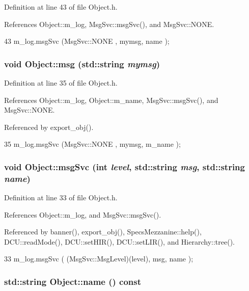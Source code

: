 Definition at line 43 of file Object.h.

References Object::m\_\-log, MsgSvc::msgSvc(), and MsgSvc::NONE.


\begin{DoxyCode}
43 { m_log.msgSvc (MsgSvc::NONE    , mymsg, name ); }
\end{DoxyCode}
\hypertarget{classObject_a58b2d0618c2d08cf2383012611528d97}{
\subsubsection[{msg}]{\setlength{\rightskip}{0pt plus 5cm}void Object::msg (std::string {\em mymsg})}}
\label{classObject_a58b2d0618c2d08cf2383012611528d97}


Definition at line 35 of file Object.h.

References Object::m\_\-log, Object::m\_\-name, MsgSvc::msgSvc(), and MsgSvc::NONE.

Referenced by export\_\-obj().


\begin{DoxyCode}
35 { m_log.msgSvc (MsgSvc::NONE    , mymsg, m_name ); }
\end{DoxyCode}
\hypertarget{classObject_a3f9d5537ebce0c0f2bf6ae4d92426f3c}{
\subsubsection[{msgSvc}]{\setlength{\rightskip}{0pt plus 5cm}void Object::msgSvc (int {\em level}, \/  std::string {\em msg}, \/  std::string {\em name})}}
\label{classObject_a3f9d5537ebce0c0f2bf6ae4d92426f3c}


Definition at line 33 of file Object.h.

References Object::m\_\-log, and MsgSvc::msgSvc().

Referenced by banner(), export\_\-obj(), SpecsMezzanine::help(), DCU::readMode(), DCU::setHIR(), DCU::setLIR(), and Hierarchy::tree().


\begin{DoxyCode}
33 { m_log.msgSvc ( (MsgSvc::MsgLevel)(level), msg, name ); }
\end{DoxyCode}
\hypertarget{classObject_a975e888d50bfcbffda2c86368332a5cd}{
\subsubsection[{name}]{\setlength{\rightskip}{0pt plus 5cm}std::string Object::name () const}}
\label{classObject_a975e888d50bfcbffda2c86368332a5cd}


